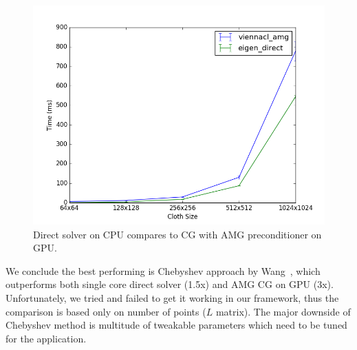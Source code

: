 \documentclass{article}
\begin{document}
\begin{figure}[htb!]
        \centering
        \includegraphics[width=0.9\linewidth]{img/amg_direct.png}
        \caption{Direct solver on CPU compares to CG with AMG preconditioner
                 on GPU. \label{fig:amg_direct}}
\end{figure}


We conclude the best performing is Chebyshev approach by Wang~\cite{Wang15},
which outperforms both single core direct solver (1.5x) and AMG CG on GPU (3x).
Unfortunately, we tried and failed to get it working in our framework, thus
the comparison is based only on number of points ($L$ matrix). The major
downside of Chebyshev method is multitude of tweakable parameters which need
to be tuned for the application.


{}

\end{document}

